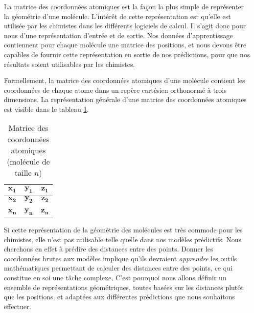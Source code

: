 \label{repr_mat_coords}

\par La matrice des coordonnées atomiques est la façon la plus simple de représenter la géométrie d'une molécule. L'intérêt de cette représentation est qu'elle est utilisée par les chimistes dans les différents logiciels de calcul. Il s'agit donc pour nous d'une représentation d'entrée et de sortie. Nos données d'apprentissage contiennent pour chaque molécule une matrice des positions, et nous devons être capables de fournir cette représentation en sortie de nos prédictions, pour que nos résultats soient utilisables par les chimistes.\\

\par Formellement, la matrice des coordonnées atomiques d'une molécule contient les coordonnées de chaque atome dans un repère cartésien orthonormé à trois dimensions. La représentation générale d'une matrice des coordonnées atomiques est visible dans le tableau \ref{table_matr_coords}.\\

\begin{table}
	\centering
	
	\begin{tabular}{|c|c|c|}
		\hline
		$\boldsymbol{x_1}$ & $\boldsymbol{y_1}$ & $\boldsymbol{z_1}$ \\ \hline	
		$\boldsymbol{x_2}$ & $\boldsymbol{y_2}$ & $\boldsymbol{z_2}$ \\ \hline	
		\textbf{\rot{... }} & \textbf{\rot{... }} & \textbf{\rot{... }}\\ \hline 	
		$\boldsymbol{x_n}$ & $\boldsymbol{y_n}$ & $\boldsymbol{z_n}$ \\ \hline	
	\end{tabular}
	
	\caption{Matrice des coordonnées atomiques (molécule de taille $n$)}
	\label{table_matr_coords}
\end{table}

\par Si cette représentation de la géométrie des molécules est très commode pour les chimistes, elle n'est pas utilisable telle quelle dans nos modèles prédictifs. Nous cherchons en effet à prédire des distances entre des points. Donner les coordonnées brutes aux modèles implique qu'ils devraient \emph{apprendre} les outils mathématiques permettant de calculer des distances entre des points, ce qui constitue en soi une tâche complexe. C'est pourquoi nous allons définir un ensemble de représentations géométriques, toutes basées sur les distances plutôt que les positions, et adaptées aux différentes prédictions que nous souhaitons effectuer.